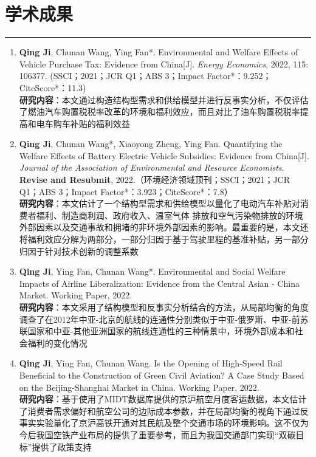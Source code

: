 \documentclass[letterpaper]{article}
\begin{document}
\section*{学术成果}
\hrule
\vspace{0.25cm}
  \begin{enumerate}
    \item \textbf{Qing Ji}, Chunan Wang, Ying Fan*. Environmental and Welfare Effects of Vehicle Purchase Tax: Evidence from China[J]. {\it Energy Economics}, 2022, 115: 106377. (SSCI；2021；JCR Q1；ABS 3；Impact Factor*：9.252；CiteScore*：11.3) \\
    \textbf{研究内容}：本文通过构造结构型需求和供给模型并进行反事实分析，不仅评估了燃油汽车购置税税率改革的环境和福利效应，而且对比了油车购置税税率提高和电车购车补贴的福利效益
    \item \textbf{Qing Ji}, Chunan Wang*, Xiaoyong Zheng, Ying Fan. Quantifying the Welfare Effects of Battery Electric Vehicle Subsidies: Evidence from China[J]. {\it Journal of the Association of Environmental and Resource Economists}. \textbf{Revise and Resubmit}, 2022.（环境经济领域顶刊；SSCI；2021；JCR Q1；ABS 3；Impact Factor*：3.923；CiteScore*：7.8） \\
    \textbf{研究内容}：本文估计了一个结构型需求和供给模型以量化了电动汽车补贴对消费者福利、制造商利润、政府收入、温室气体 排放和空气污染物排放的环境外部因素以及交通事故和拥堵的非环境外部因素的影响。最重要的是，本文还将福利效应分解为两部分，一部分归因于基于驾驶里程的基准补贴，另一部分归因于针对技术创新的调整系数
    \item \textbf{Qing Ji}, Ying Fan, Chunan Wang*. Environmental and Social Welfare Impacts of Airline Liberalization: Evidence from the Central Asian - China Market. Working Paper, 2022.\\
    \textbf{研究内容}：本文采用了结构模型和反事实分析结合的方法，从局部均衡的角度调查了在2012年中亚-北京的航线的连通性分别类似于中亚-俄罗斯、中亚-前苏联国家和中亚-其他亚洲国家的航线连通性的三种情景中，环境外部成本和社会福利的变化情况
    \item \textbf{Qing Ji}, Ying Fan, Chunan Wang. Is the Opening of High-Speed Rail Beneficial to the Construction of Green Civil Aviation? A Case Study Based on the Beijing-Shanghai Market in China. Working Paper, 2022.\\
    \textbf{研究内容}：基于使用了MIDT数据库提供的京沪航空月度客运数据，本文估计了消费者需求偏好和航空公司的边际成本参数，并在局部均衡的视角下通过反事实实验量化了京沪高铁开通对其民航及整个交通市场的环境影响。这不仅为今后我国空铁产业布局的提供了重要参考，而且为我国交通部门实现“双碳目标”提供了政策支持
  \end{enumerate}
\end{document}

